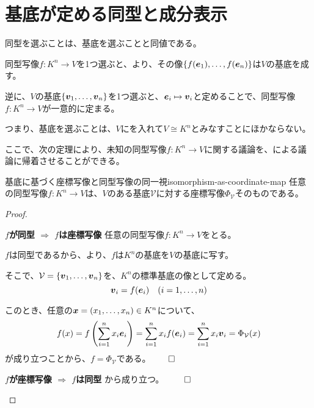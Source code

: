 \documentclass[../../../topic_linear-algebra]{subfiles}
\begin{document}
\sectionline
\section{基底が定める同型と成分表示}\label{sec:basis-isomorphism-coordinates}

同型を選ぶことは、基底を選ぶことと同値である。

\br

同型写像$f\colon K^n \to V$を1つ選ぶと、より、その像$\{ f(\vb*{e}_1), \ldots, f(\vb*{e}_n) \}$は$V$の基底を成す。

逆に、$V$の基底$\{ \vb*{v}_1, \ldots, \vb*{v}_n \}$を1つ選ぶと、$\vb*{e}_i \mapsto \vb*{v}_i$と定めることで、同型写像$f\colon K^n \to V$が一意的に定まる。

\br

つまり、基底を選ぶことは、$V$にを入れて$V \cong K^n$とみなすことにほかならない。

\br

ここで、次の定理により、未知の同型写像$f\colon K^n \to V$に関する議論を、による議論に帰着させることができる。

\begin{theorem}{基底に基づく座標写像と同型写像の同一視}{isomorphism-as-coordinate-map}
  任意の同型写像$f\colon K^n \to V$は、$V$のある基底$\mathcal{V}$に対する座標写像$\Phi_{\mathcal{V}}$そのものである。
\end{theorem}

\begin{proof}
  \begin{subpattern}{\bfseries $f$が同型 $\Longrightarrow$ $f$は座標写像}
    任意の同型写像$f\colon K^n \to V$をとる。
    
    $f$は同型であるから、より、$f$は$K^n$の基底を$V$の基底に写す。
    
    そこで、$\mathcal{V} = \{ \vb*{v}_1, \ldots, \vb*{v}_n \}$を、$K^n$の標準基底の像として定める。
    \begin{equation*}
      \vb*{v}_i = f(\vb*{e}_i) \quad (i=1,\dots,n)
    \end{equation*}
    
    このとき、任意の$\vb*{x} = (x_1,\dots,x_n) \in K^n$について、
    \begin{equation*}
      f(x) = f\left( \sum_{i=1}^n x_i \vb*{e}_i \right) = \sum_{i=1}^n x_i f(\vb*{e}_i) = \sum_{i=1}^n x_i \vb*{v}_i = \Phi_{\mathcal{V}}(x)
    \end{equation*}
    が成り立つことから、$f = \Phi_{\mathcal{V}}$である。$\qed$
  \end{subpattern}

  \begin{subpattern}{\bfseries $f$が座標写像 $\Longrightarrow$ $f$は同型}
    から成り立つ。 $\qed$
  \end{subpattern}
\end{proof}
\end{document}
